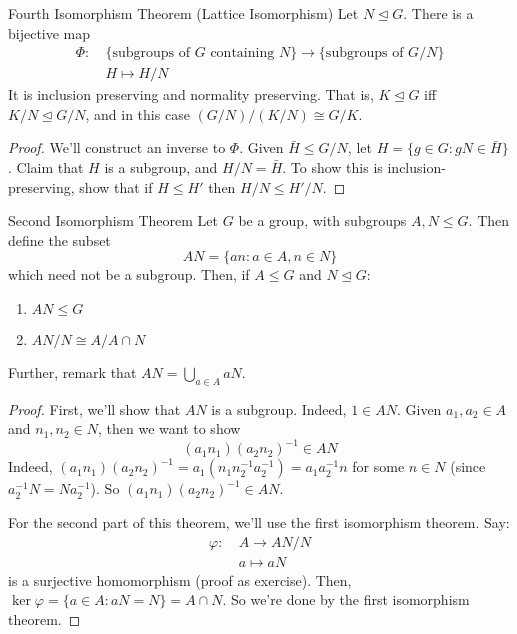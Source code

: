 \documentclass{article}
\theoremstyle{plain}
\begin{document}
\begin{theorem}{Fourth Isomorphism Theorem (Lattice Isomorphism)}{}
Let $N \trianglelefteq G$. There is a bijective map 
\begin{align*}
\Phi : \ &\{\text{subgroups of } G \text{ containing } N\} \to \{\text{subgroups of } G/N\} \\
&H \mapsto H/N
\end{align*}
It is inclusion preserving and normality preserving. That is, $K \trianglelefteq G$ iff $K/N \trianglelefteq G/N$, and in this case $(G/N)/(K/N) \cong G/K$.
\end{theorem}
\begin{proof}
We'll construct an inverse to $\Phi$. Given $\bar{H} \le G/N$, let $H = \{ g \in G : gN \in \bar{H} \}$. Claim that $H$ is a subgroup, and $H/N = \bar{H}$. To show this is inclusion-preserving, show that if $H \le H'$ then $H/N \le H'/N$.
\end{proof}
\begin{theorem}{Second Isomorphism Theorem}{}
Let $G$ be a group, with subgroups $A, N \le G$. Then define the subset $$AN = \{ an : a\in A, n\in N \}$$ which need not be a subgroup. Then, if $A \le G$ and $N \trianglelefteq G$:
\begin{enumerate}[ i. ]
\item $AN \le G$
\item $AN/N \cong A/A\cap N$
\end{enumerate}
Further, remark that $AN = \bigcup_{a\in A} aN$.
\end{theorem}
\begin{proof}
First, we'll show that $AN$ is a subgroup. Indeed, $1 \in AN$. Given $a_1,a_2 \in A$ and $n_1,n_2 \in N$, then we want to show $$(a_1n_1)(a_2n_2)^{-1} \in AN$$
Indeed, $(a_1n_1)(a_2n_2)^{-1} = a_1(n_1n_2^{-1}a_2^{-1}) = a_1a_2^{-1}n$ for some $n \in N$ (since $a_2^{-1}N = Na_2^{-1}$). So $(a_1n_1)(a_2n_2)^{-1} \in AN$.

For the second part of this theorem, we'll use the first isomorphism theorem. Say: 
\begin{align*}
\varphi : \ &A \to AN/N \\
&a \mapsto aN
\end{align*}
is a surjective homomorphism (proof as exercise). Then, $\operatorname{ker}\varphi = \{ a \in A : aN = N \} = A \cap N$. So we're done by the first isomorphism theorem.
\end{proof}
\end{document}

